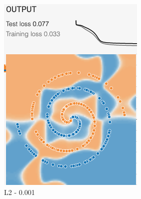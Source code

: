 \documentclass[12pt,a4paper]{article}
\begin{document}
\begin{enumerate}
\begin{figure}[H]
\begin{subfigure}[H]{0.2\textwidth}
				\includegraphics[width=\textwidth]{Figures/reg/L20001}
				\caption{L2 - 0.001}
			\end{subfigure}
			\begin{subfigure}[H]{0.2\textwidth}
				\centering

\end{subfigure}
\end{figure}
\end{enumerate}
\end{document}
